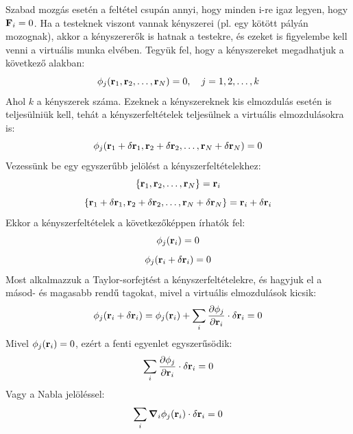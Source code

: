 \documentclass[a4paper,12pt]{article}
\begin{document}
Szabad mozgás esetén a feltétel csupán annyi, hogy minden i-re igaz legyen, hogy $\bold{F}_i = 0$. Ha a testeknek viszont vannak kényszerei (pl. egy kötött pályán mozognak), akkor a kényszererők is hatnak a testekre,
és ezeket is figyelembe kell venni a virtuális munka elvében. Tegyük fel, hogy a kényszereket megadhatjuk a következő alakban:
\begin{equation}
    \phi_j(\bold{r}_1, \bold{r}_2, \ldots, \bold{r}_N) = 0, \quad j = 1, 2, \ldots, k
\end{equation}
Ahol $k$ a kényszerek száma. Ezeknek a kényszereknek kis elmozdulás esetén is teljesülniük kell, tehát a kényszerfeltételek teljesülnek a virtuális elmozdulásokra is:
\begin{equation}
    \phi_j (\bold{r}_1 + \delta \bold{r}_1, \bold{r}_2 + \delta \bold{r}_2, \ldots, \bold{r}_N + \delta \bold{r}_N) = 0
\end{equation}
Vezessünk be egy egyszerűbb jelölést a kényszerfeltételekhez:
\begin{equation}
    \{\bold{r}_1, \bold{r}_2, \ldots, \bold{r}_N\} = \bold{r}_i
\end{equation}
\begin{equation}
    \{\bold{r}_1 + \delta \bold{r}_1, \bold{r}_2 + \delta \bold{r}_2, \ldots, \bold{r}_N + \delta \bold{r}_N\} = \bold{r}_i + \delta \bold{r}_i
\end{equation}
Ekkor a kényszerfeltételek a következőképpen írhatók fel:
\begin{equation}
    \phi_j (\bold{r}_i) = 0
\end{equation}
\begin{equation}
    \phi_j (\bold{r}_i + \delta \bold{r}_i) = 0
\end{equation}
Most alkalmazzuk a Taylor-sorfejtést a kényszerfeltételekre, és hagyjuk el a másod- és magasabb rendű tagokat, mivel a virtuális elmozdulások kicsik:
\begin{equation}
    \phi_j (\bold{r}_i + \delta \bold{r}_i) = \phi_j (\bold{r}_i) + \sum_i \frac{\partial \phi_j}{\partial \bold{r}_i} \cdot \delta \bold{r}_i = 0
\end{equation}
Mivel $\phi_j (\bold{r}_i) = 0$, ezért a fenti egyenlet egyszerűsödik:
\begin{equation}
    \sum_i \frac{\partial \phi_j}{\partial \bold{r}_i} \cdot \delta \bold{r}_i = 0
\end{equation}
Vagy a Nabla jelöléssel:
\begin{equation}
    \sum_i \boldsymbol{\nabla}_i \phi_j(\bold{r}_i) \cdot \delta \bold{r}_i = 0
\end{equation}
\end{document}
